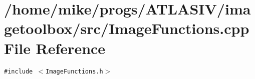 \section{/home/mike/progs/ATLASIV/imagetoolbox/src/Image\-Functions.cpp File Reference}
\label{ImageFunctions_8cpp}
{\tt \#include $<$Image\-Functions.h$>$}\par
